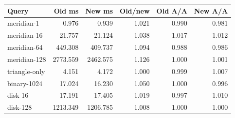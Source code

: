 \begin{center}\small
\begin{tabular}{lrrrrr}
\toprule
Query & Old ms & New ms & Old/new & Old A/A & New A/A \\
\midrule
meridian-1 & 0.976 & 0.939 & 1.021 & 0.990 & 0.981 \\
meridian-16 & 21.757 & 21.124 & 1.038 & 1.017 & 1.012 \\
meridian-64 & 449.308 & 409.737 & 1.094 & 0.988 & 0.986 \\
meridian-128 & 2773.559 & 2462.575 & 1.126 & 1.000 & 1.001 \\
triangle-only & 4.151 & 4.172 & 1.000 & 0.999 & 1.007 \\
binary-1024 & 17.024 & 16.230 & 1.050 & 1.000 & 0.996 \\
disk-16 & 17.191 & 17.405 & 1.019 & 0.997 & 1.010 \\
disk-128 & 1213.349 & 1206.785 & 1.008 & 1.000 & 1.000 \\
\bottomrule
\end{tabular}
\end{center}
